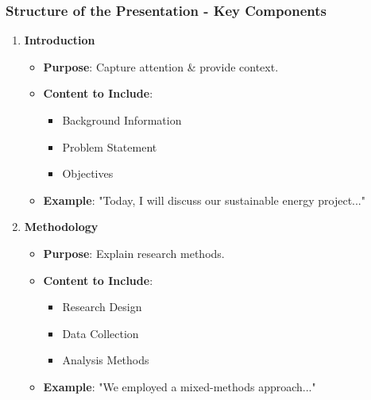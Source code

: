 \documentclass[aspectratio=169]{beamer}
\begin{document}
\begin{frame}[fragile]
    \frametitle{Structure of the Presentation - Key Components}
    \begin{enumerate}
        \item \textbf{Introduction}
            \begin{itemize}
                \item \textbf{Purpose}: Capture attention & provide context.
                \item \textbf{Content to Include}:
                    \begin{itemize}
                        \item Background Information
                        \item Problem Statement
                        \item Objectives
                    \end{itemize}
                \item \textbf{Example}: "Today, I will discuss our sustainable energy project..."
            \end{itemize}
        
        \item \textbf{Methodology}
            \begin{itemize}
                \item \textbf{Purpose}: Explain research methods.
                \item \textbf{Content to Include}:
                    \begin{itemize}
                        \item Research Design
                        \item Data Collection
                        \item Analysis Methods
                    \end{itemize}
                \item \textbf{Example}: "We employed a mixed-methods approach..."
            \end{itemize}
    \end{enumerate}
\end{frame}
\end{document}
